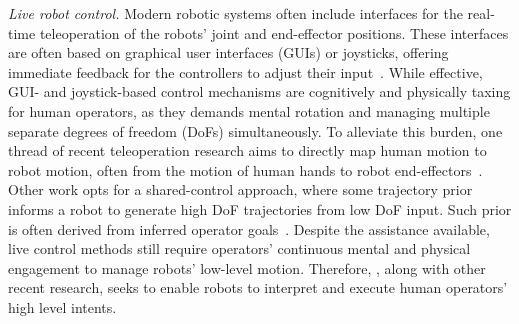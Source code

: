 
\noindent \emph{Live robot control.} Modern robotic systems often include interfaces for the real-time teleoperation of the robots' joint and end-effector positions.
These interfaces are often based on graphical user interfaces (GUIs) or joysticks, offering immediate feedback for the controllers to adjust their input~\cite{darvish2023teleoperation,rea2022still}.
While effective, GUI- and joystick-based control mechanisms are cognitively and physically taxing for human operators, as they demands mental rotation and managing multiple separate degrees of freedom (DoFs) simultaneously.
To alleviate this burden, one thread of recent teleoperation research aims to directly map human motion to robot motion, often from the motion of human hands to robot end-effectors~\cite{rakita2017motion,rakita2019shared,fu2024mobile}.
Other work opts for a shared-control approach, where some trajectory prior informs a robot to generate high DoF trajectories from low DoF input.
Such prior is often derived from inferred operator goals~\cite{huang2016anticipatory,jain2019probabilistic,losey2022learning}.
Despite the assistance available, live control methods still require operators' continuous mental and physical engagement to manage robots' low-level motion.
Therefore, \projname, along with other recent research, seeks to enable robots to interpret and execute human operators' high level intents.


